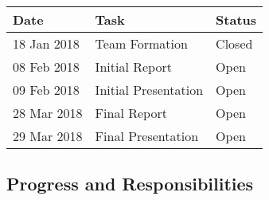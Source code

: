 \documentclass{article}
\begin{document}
\begin{center}
\begin{tabular}{|p{3cm}p{3cm}p{3cm}|}
\hline
\textbf{Date} & \textbf{Task} & \textbf{Status} \\
\hline
18 Jan 2018 & Team Formation & Closed \\
08 Feb 2018 & Initial Report & Open \\
09 Feb 2018 & Initial Presentation &Open \\
28 Mar 2018 & Final Report & Open \\
29 Mar 2018	& Final Presentation & Open \\
\hline

\end{tabular}
\end{center}

\subsection{Progress and Responsibilities}
\end{document}
